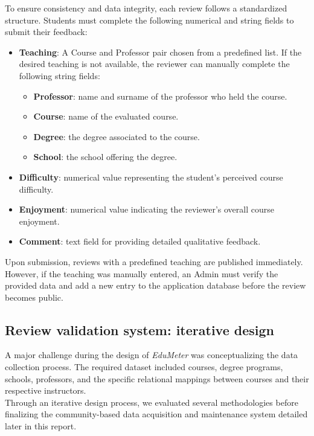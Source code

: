 \noindent
To ensure consistency and data integrity, each review follows a standardized structure. Students must complete the following numerical and string fields to submit their feedback:

\begin{itemize}
	\item \textbf{Teaching}: A Course and Professor pair chosen from a predefined list. 
	If the desired teaching is not available, the reviewer can manually complete the following string fields:
	\begin{itemize}
		\item \textbf{Professor}: name and surname of the professor who held the course.
		\item \textbf{Course}: name of the evaluated course.
		\item \textbf{Degree}: the degree associated to the course.
		\item \textbf{School}: the school offering the degree.
	\end{itemize}
	\item \textbf{Difficulty}: numerical value representing the student's perceived course difficulty.
	\item \textbf{Enjoyment}: numerical value indicating the reviewer's overall course enjoyment.
	\item \textbf{Comment}: text field for providing detailed qualitative feedback.
\end{itemize}
Upon submission, reviews with a predefined teaching are published immediately. However, if the teaching was manually entered, an Admin must verify the provided data and add a new entry to the application database before the review becomes public.

\subsection{Review validation system: iterative design}

A major challenge during the design of \textit{EduMeter} was conceptualizing the data collection process. The required dataset included courses, degree programs, schools, professors, and the specific relational mappings between courses and their respective instructors. \\

Through an iterative design process, we evaluated several methodologies before finalizing the community-based data acquisition and maintenance system detailed later in this report.

